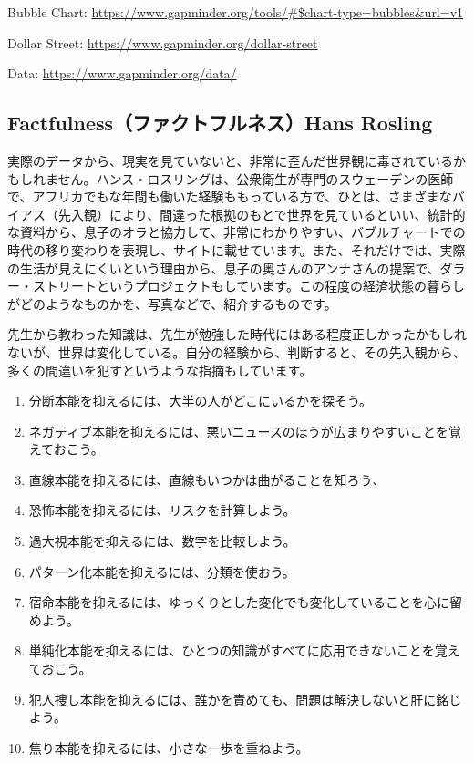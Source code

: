 \documentclass[
  xelatex, ja=standard]{bxjsbook}
\theoremstyle{definition}
\theoremstyle{definition}
\theoremstyle{definition}
\theoremstyle{definition}
\theoremstyle{remark}
\begin{document}
Bubble Chart: \url{https://www.gapminder.org/tools/\#$chart-type=bubbles\&url=v1}

Dollar Street: \url{https://www.gapminder.org/dollar-street}

Data: \url{https://www.gapminder.org/data/}

\hypertarget{factfulnessux30d5ux30a1ux30afux30c8ux30d5ux30ebux30cdux30b9hans-rosling}{%
\subsection{Factfulness（ファクトフルネス）Hans Rosling}\label{factfulnessux30d5ux30a1ux30afux30c8ux30d5ux30ebux30cdux30b9hans-rosling}}

実際のデータから、現実を見ていないと、非常に歪んだ世界観に毒されているかもしれません。ハンス・ロスリングは、公衆衛生が専門のスウェーデンの医師で、アフリカでもな年間も働いた経験ももっている方で、ひとは、さまざまなバイアス（先入観）により、間違った根拠のもとで世界を見ているといい、統計的な資料から、息子のオラと協力して、非常にわかりやすい、バブルチャートでの時代の移り変わりを表現し、サイトに載せています。また、それだけでは、実際の生活が見えにくいという理由から、息子の奥さんのアンナさんの提案で、ダラー・ストリートというプロジェクトもしています。この程度の経済状態の暮らしがどのようなものかを、写真などで、紹介するものです。

先生から教わった知識は、先生が勉強した時代にはある程度正しかったかもしれないが、世界は変化している。自分の経験から、判断すると、その先入観から、多くの間違いを犯すというような指摘もしています。

\begin{enumerate}
\def\labelenumi{\arabic{enumi}.}
\item
  分断本能を抑えるには、大半の人がどこにいるかを探そう。
\item
  ネガティブ本能を抑えるには、悪いニュースのほうが広まりやすいことを覚えておこう。
\item
  直線本能を抑えるには、直線もいつかは曲がることを知ろう、
\item
  恐怖本能を抑えるには、リスクを計算しよう。
\item
  過大視本能を抑えるには、数字を比較しよう。
\item
  パターン化本能を抑えるには、分類を使おう。
\item
  宿命本能を抑えるには、ゆっくりとした変化でも変化していることを心に留めよう。
\item
  単純化本能を抑えるには、ひとつの知識がすべてに応用できないことを覚えておこう。
\item
  犯人捜し本能を抑えるには、誰かを責めても、問題は解決しないと肝に銘じよう。
\item
  焦り本能を抑えるには、小さな一歩を重ねよう。
\end{enumerate}
\end{document}
